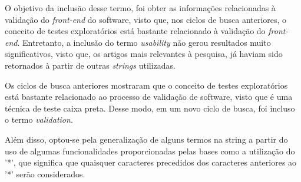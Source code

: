 O objetivo da inclusão desse termo, foi obter as informações relacionadas à validação do \textit{front-end} do software, visto que, nos ciclos de busca anteriores, o conceito de testes exploratórios está bastante relacionado à validação do \textit{front-end}. Entretanto, a inclusão do termo \textit{usability} não gerou resultados muito significativos, visto que, os artigos mais relevantes à pesquisa, já haviam sido retornados à partir de outras \textit{strings} utilizadas. 

Os ciclos de busca anteriores mostraram que o conceito de testes exploratórios está bastante relacionado ao processo de validação de software, visto que é uma técnica de teste caixa preta. Desse modo, em um novo ciclo de busca, foi incluso o termo \textit{validation}. 

Além disso, optou-se pela generalização de alguns termos na string a partir do uso de algumas funcionalidades proporcionadas pelas bases como a utilização do ’*’, que significa que quaisquer caracteres precedidos dos caracteres anteriores ao ’*’ serão
considerados. 

